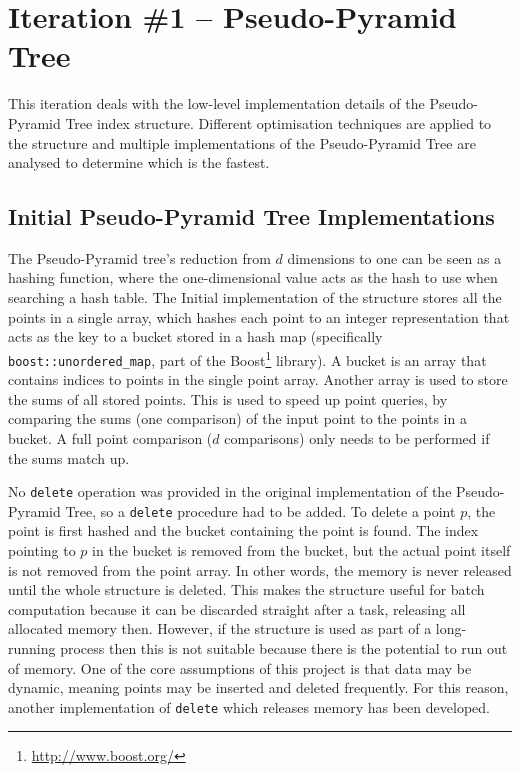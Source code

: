 \section{Iteration \#1 -- Pseudo-Pyramid Tree}
\label{sec:iteration1}

This iteration deals with the low-level implementation details of the Pseudo-Pyramid Tree index structure. Different optimisation techniques are applied to the structure and multiple implementations of the Pseudo-Pyramid Tree are analysed to determine which is the fastest.

\subsection{Initial Pseudo-Pyramid Tree Implementations}

The Pseudo-Pyramid tree's reduction from $d$ dimensions to one can be seen as a hashing function, where the one-dimensional value acts as the hash to use when searching a hash table. The Initial implementation of the structure stores all the points in a single array, which hashes each point to an integer representation that acts as the key to a bucket stored in a hash map (specifically \texttt{boost::unordered\_map}, part of the Boost\footnote{\url{http://www.boost.org/}} library). A bucket is an array that contains indices to points in the single point array. Another array is used to store the sums of all stored points. This is used to speed up point queries, by comparing the sums (one comparison) of the input point to the points in a bucket. A full point comparison ($d$ comparisons) only needs to be performed if the sums match up.

No \texttt{delete} operation was provided in the original implementation of the Pseudo-Pyramid Tree, so a \texttt{delete} procedure had to be added. To delete a point $p$, the point is first hashed and the bucket containing the point is found. The index pointing to $p$ in the bucket is removed from the bucket, but the actual point itself is not removed from the point array. In other words, the memory is never released until the whole structure is deleted. This makes the structure useful for batch computation because it can be discarded straight after a task, releasing all allocated memory then. However, if the structure is used as part of a long-running process then this is not suitable because there is the potential to run out of memory.  One of the core assumptions of this project is that data may be dynamic, meaning points may be inserted and deleted frequently. For this reason, another implementation of \texttt{delete} which releases memory has been developed.

